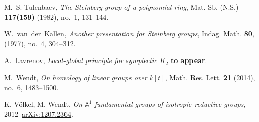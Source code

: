 \documentclass[oneside,12pt]{amsart}
\numberwithin{equation}{section}
\numberwithin{lem}{section}
\theoremstyle{definition}
\theoremstyle{remark}
\newcommand{\Aff}{\mathbb{A}}
\begin{document}
{\begin{thebibliography}{MMMM}
M.~S. Tulenbaev, \emph{The {S}teinberg group of a polynomial ring},
Mat. Sb. (N.S.) \textbf{117(159)} (1982), no.~1, 131--144.

W.~van~der~Kallen, \emph{\href{http://dx.doi.org/10.1016/1385-7258(77)90026-9}{Another presentation for {S}teinberg groups}},
Indag. Math. {\bf 80}, (1977), no.~4, 304--312.

A.~Lavrenov, \emph{Local-global principle for symplectic $K_2$}
{\bf to appear}.

M.~Wendt, \emph{\href{https://dx.doi.org/10.4310/MRL.2014.v21.n6.a15}{On homology of linear groups over {$k[t]$}}},
Math. Res. Lett. \textbf{21} (2014), no.~6, 1483--1500.

 K. V\"olkel, M. Wendt,
\emph{On $\Aff^1$-fundamental groups of isotropic reductive groups},
2012~\href{http://arxiv.org/abs/1207.2364}{arXiv:1207.2364}.
\end{thebibliography}

} %
\end{document}
